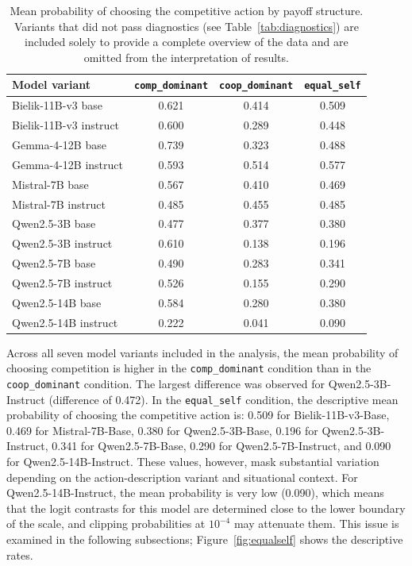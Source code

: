 \documentclass[11pt]{article}
\newcommand{\equalself}{\texttt{equal\_self}}
\begin{document}
\begin{table}[H]
\centering
\small
\caption{Mean probability of choosing the competitive action by payoff structure. Variants that did not pass diagnostics (see Table~\ref{tab:diagnostics}) are included solely to provide a complete overview of the data and are omitted from the interpretation of results.}
\begin{tabular}{lccc}
\toprule
Model variant & \texttt{comp\_dominant} & \texttt{coop\_dominant} & \texttt{equal\_self} \\
\midrule
Bielik-11B-v3 base      & 0.621 & 0.414 & 0.509 \\
Bielik-11B-v3 instruct  & 0.600 & 0.289 & 0.448 \\
Gemma-4-12B base        & 0.739 & 0.323 & 0.488 \\
Gemma-4-12B instruct    & 0.593 & 0.514 & 0.577 \\
Mistral-7B base         & 0.567 & 0.410 & 0.469 \\
Mistral-7B instruct     & 0.485 & 0.455 & 0.485 \\
Qwen2.5-3B base         & 0.477 & 0.377 & 0.380 \\
Qwen2.5-3B instruct     & 0.610 & 0.138 & 0.196 \\
Qwen2.5-7B base         & 0.490 & 0.283 & 0.341 \\
Qwen2.5-7B instruct     & 0.526 & 0.155 & 0.290 \\
Qwen2.5-14B base        & 0.584 & 0.280 & 0.380 \\
Qwen2.5-14B instruct    & 0.222 & 0.041 & 0.090 \\
\bottomrule
\end{tabular}
\label{tab:payoffmeans}
\end{table}

Across all seven model variants included in the analysis, the mean probability of choosing competition is higher in the \texttt{comp\_dominant} condition than in the \texttt{coop\_dominant} condition. The largest difference was observed for Qwen2.5-3B-Instruct (difference of 0.472).
In the \equalself{} condition, the descriptive mean probability of choosing the competitive action is: 0.509 for Bielik-11B-v3-Base, 0.469 for Mistral-7B-Base, 0.380 for Qwen2.5-3B-Base, 0.196 for Qwen2.5-3B-Instruct, 0.341 for Qwen2.5-7B-Base, 0.290 for Qwen2.5-7B-Instruct, and 0.090 for Qwen2.5-14B-Instruct.
These values, however, mask substantial variation depending on the action-description variant and situational context. For Qwen2.5-14B-Instruct, the mean probability is very low (0.090), which means that the logit contrasts for this model are determined close to the lower boundary of the scale, and clipping probabilities at $10^{-4}$ may attenuate them. This issue is examined in the following subsections; Figure~\ref{fig:equalself} shows the descriptive rates.
\end{document}
